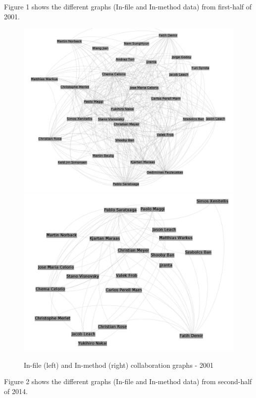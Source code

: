 \documentclass[a4paper]{article}
\begin{document}
Figure 1 shows the different graphs (In-file and In-method data) from
first-half of 2001.

\begin{figure}[ht]
\begin{center}
\includegraphics[scale=0.17]{g2001files.png} 
\includegraphics[scale=0.17]{g2001methods.png}
\caption{In-file (left) and In-method (right) collaboration graphs - 2001}
\label{fig:fixme1}
\end{center}
\end{figure}

Figure 2 shows the different graphs (In-file and In-method data) from
second-half of 2014.
\end{document}

